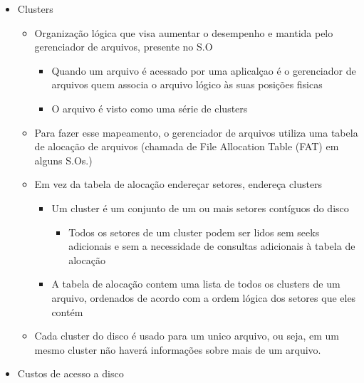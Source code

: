 \documentclass[12pt]{article}
\begin{document}
\begin{itemize}
\begin{itemize}
\begin{itemize}
\begin{itemize}[label=R:]
                \end{itemize}
            \end{itemize}
        \end{itemize}
        \item Clusters
        \begin{itemize}
            \item Organização lógica que visa aumentar o desempenho e mantida 
            pelo gerenciador de arquivos, presente no S.O
            \begin{itemize}
                \item Quando um arquivo é acessado por uma aplicalçao é o 
                gerenciador de arquivos quem associa o arquivo lógico às suas 
                posições fisicas
                \item O arquivo é visto como uma série de clusters
            \end{itemize}
            \item Para fazer esse mapeamento, o gerenciador de arquivos
            utiliza uma tabela de alocação de arquivos (chamada de File 
            Allocation Table (FAT) em alguns S.Os.)
            \item Em vez da tabela de alocação endereçar setores, endereça 
            clusters
            \begin{itemize}
                \item Um cluster é um conjunto de um ou mais setores contíguos 
                do disco
                \begin{itemize}
                    \item Todos os setores de um cluster podem ser lidos sem 
                    seeks adicionais e sem a necessidade de consultas adicionais 
                    à tabela de alocação
                \end{itemize}
                \item A tabela de alocação contem uma lista de todos os 
                clusters de um arquivo, ordenados de acordo com a ordem lógica 
                dos setores que eles contém
            \end{itemize}
            \item Cada cluster do disco é usado para um unico arquivo, ou seja, 
            em um mesmo cluster não haverá informações sobre mais de um arquivo. 
        \end{itemize}
        \item Custos de acesso a disco
        \begin{itemize}

\end{itemize}
\end{itemize}
\end{document}
